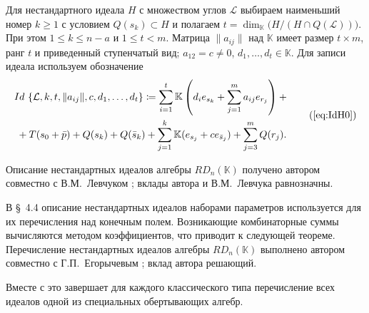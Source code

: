 Для нестандартного идеала $H$ с множеством углов $\mathcal{L}$ выбираем
наименьший номер $k\geq1$ с условием $Q(s_k)\subset H$ и полагаем
$t=\dim_{\mathbb{K}}\bigl(H/(H\cap Q(\mathcal{L}))\bigr)$. При этом $1\leq
k\leq n-a$ и $1\leq t<m$. Матрица $\|a_{ij}\|$ над $\mathbb{K}$ имеет размер
$t\times m$, ранг $t$ и приведенный ступенчатый вид; $a_{12}=c\neq0$,
$d_1,\dots,d_t\in\mathbb{K}$. Для записи идеала используем обозначение
\begin{equation*}
    \begin{gathered}
        Id\ \{\mathcal{L},k,t,\|a_{ij}\|,c,d_1,\dots,d_t\}\coloneq
        \sum_{i=1}^t\mathbb{K}\left(d_ie_{s_k}+\sum_{j=1}^m a_{ij}e_{r_j}\right)+{}\\
        {}+T(s_0+\bar{p})+Q(s_k)+Q(\bar{s}_k)
        +\sum_{j=1}^k\mathbb{K}(e_{s_j}+ce_{\bar{s}_j})+\sum_{j=3}^m Q(r_j).
    \end{gathered}
    \tag{\ref*{eq:IdH0}}
\end{equation*}

Описание нестандартных идеалов алгебры $RD_n(\mathbb{K})$ получено автором
совместно с В.\:М.~Левчуком \cite[теорема~6]{smj2023}; вклады автора и
В.\:М.~Левчука равнозначны.


В \S~4.4 описание нестандартных идеалов наборами параметров используется для их
перечисления над конечным полем. Возникающие комбинаторные суммы вычисляются
методом коэффициентов, что приводит к следующей теореме. Перечисление
нестандартных идеалов алгебры $RD_n(\mathbb{K})$ выполнено автором совместно с
Г.\:П.~Егорычевым \cite[теорема~7]{smj2023}; вклад автора решающий.


Вместе с  это завершает для каждого
классического типа перечисление всех идеалов одной из специальных обертывающих
алгебр.

\FloatBarrier


\insertbiblioexternal   %
\insertbiblioauthor     %
